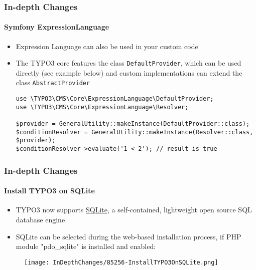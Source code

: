 
\begin{frame}[fragile]
	\frametitle{In-depth Changes}
	\framesubtitle{Symfony ExpressionLanguage}

	\lstset{basicstyle=\tiny\ttfamily}

	\begin{itemize}
		\item Expression Language can also be used in your custom code
		\item The TYPO3 core features the class \texttt{DefaultProvider}, which
			can be used directly (see example below) and custom implementations
			can extend the class \texttt{AbstractProvider}

\begin{lstlisting}
use \TYPO3\CMS\Core\ExpressionLanguage\DefaultProvider;
use \TYPO3\CMS\Core\ExpressionLanguage\Resolver;

$provider = GeneralUtility::makeInstance(DefaultProvider::class);
$conditionResolver = GeneralUtility::makeInstance(Resolver::class, $provider);
$conditionResolver->evaluate('1 < 2'); // result is true
\end{lstlisting}

	\end{itemize}

\end{frame}


\begin{frame}[fragile]
	\frametitle{In-depth Changes}
	\framesubtitle{Install TYPO3 on SQLite}

	\begin{itemize}
		\item TYPO3 now supports \href{https://www.sqlite.org}{SQLite},
			a self-contained, lightweight open source SQL database engine
		\item SQLite can be selected during the web-based installation process,
			if PHP module "pdo\_sqlite" is installed and enabled:
	\end{itemize}

	\begin{figure}
		\texttt{[image: InDepthChanges/85256-InstallTYPO3OnSQLite.png]}
	\end{figure}

\end{frame}

